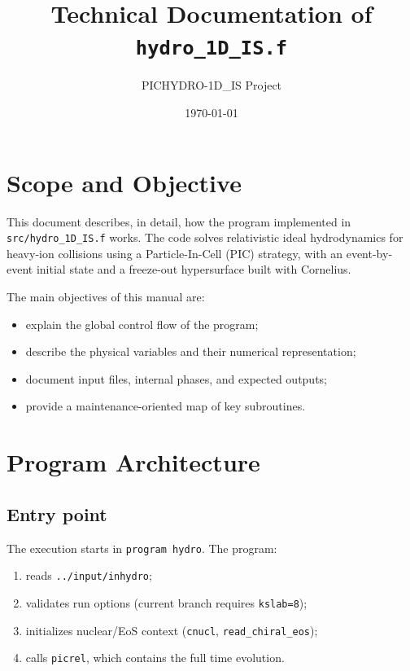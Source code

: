 \documentclass[11pt,a4paper]{article}
\title{Technical Documentation of \texttt{hydro\_1D\_IS.f}}
\author{PICHYDRO-1D\_IS Project}
\date{\today}
\begin{document}
\maketitle
\tableofcontents
\newpage

\section{Scope and Objective}
This document describes, in detail, how the program implemented in
\texttt{src/hydro\_1D\_IS.f} works. The code solves relativistic ideal
hydrodynamics for heavy-ion collisions using a Particle-In-Cell (PIC)
strategy, with an event-by-event initial state and a freeze-out hypersurface
built with Cornelius.

The main objectives of this manual are:
\begin{itemize}
\item explain the global control flow of the program;
\item describe the physical variables and their numerical representation;
\item document input files, internal phases, and expected outputs;
\item provide a maintenance-oriented map of key subroutines.
\end{itemize}

\section{Program Architecture}
\subsection{Entry point}
The execution starts in \texttt{program hydro}. The program:
\begin{enumerate}
\item reads \texttt{../input/inhydro};
\item validates run options (current branch requires \texttt{kslab=8});
\item initializes nuclear/EoS context (\texttt{cnucl}, \texttt{read\_chiral\_eos});
\item calls \texttt{picrel}, which contains the full time evolution.
\end{enumerate}
\end{document}

